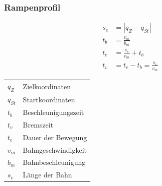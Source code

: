 \subsubsection{Rampenprofil }
\begin{minipage}{0.4\linewidth}
    \begin{align*}
        s_e &= |q_Z - q_{St}|\\
        t_b &= \frac{v_m}{b_m}\\
        t_e &= \frac{s_e}{v_m}+t_b\\
        t_v &= t_e - t_b = \frac{s_e}{v_m}
    \end{align*}
        \begin{tabular}{ll}
        $q_Z$ & Zielkoordinaten\\
        $q_{St}$& Startkoordinaten\\
        $t_b$ & Beschleunigungszeit\\
        $t_v$ & Bremszeit \\
        $t_e$ & Dauer der Bewegung\\
        $v_m$ & Bahngeschwindigkeit\\
        $b_m$ & Bahnbeschleunigung\\
        $s_e$ & Länge der Bahn\\
    \end{tabular}
\end{minipage}

